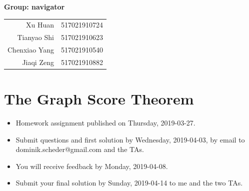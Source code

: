 \documentclass[12pt,a4]{article}
\begin{document}
\setcounter{section}{4}
\begin{center}
  \large\textbf{Group: navigator} 
\end{center}
\begin{center}
  \begin{tabular}{rl}
 Xu Huan  & 517021910724 \\
 Tianyao Shi     &     517021910623 \\
Chenxiao Yang    &    517021910540  \\
Jiaqi  Zeng      &     517021910882  \\
  \end{tabular}
\end{center}

\newpage
\section{The Graph Score Theorem}



\begin{itemize}
 \item Homework assignment published on Thursday, 2019-03-27.
 \item Submit questions and first solution by Wednesday, 2019-04-03, by
 email to dominik.scheder@gmail.com and the TAs.
 \item You will receive feedback by Monday, 2019-04-08.
 \item Submit your final solution by Sunday, 2019-04-14 to me and the two TAs.
\end{itemize}
\end{document}
